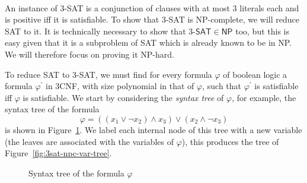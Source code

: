 \begin{example}\ \\
    \label{ex:3sat-npc}
    An instance of 3-\textsf{SAT} is a conjunction of clauses with at most 3 literals each and is positive iff it is satisfiable. To show that 3-\textsf{SAT} is \textsf{NP}-complete, we will reduce \textsf{SAT} to it. It is technically necessary to show that \(3\textsf{-SAT}\in\textsf{NP}\) too, but this is easy given that it is a subproblem of \textsf{SAT} which is already known to be in \textsf{NP}. We will therefore focus on proving it \textsf{NP}-hard.

    To reduce \textsf{SAT} to 3-\textsf{SAT}, we must find for every formula \(\varphi\) of boolean logic a formula \(\varphi^\prime\) in 3CNF, with size polynomial in that of \(\varphi\), such that \(\varphi^\prime\) is satisfiable iff \(\varphi\) is satisfiable. We start by considering the \emph{syntax tree} of \(\varphi\), for example, the syntax tree of the formula 
    \[\varphi = \left((x_1 \vee \neg x_2) \wedge x_3\right) \vee (x_2 \wedge \neg x_3)\] 
    is shown in Figure~\ref{fig:3sat-npc-syntax-tree}. We label each internal node of this tree with a new variable (the leaves are associated with the variables of \(\varphi\)), this produces the tree of Figure~\ref{fig:3sat-npc-var-tree}.
    \begin{figure}[htb]
        \begin{center}
        \end{center}
        \caption{Syntax tree of the formula \(\varphi\)}
        \label{fig:3sat-npc-syntax-tree}
    \end{figure}


\end{example}
